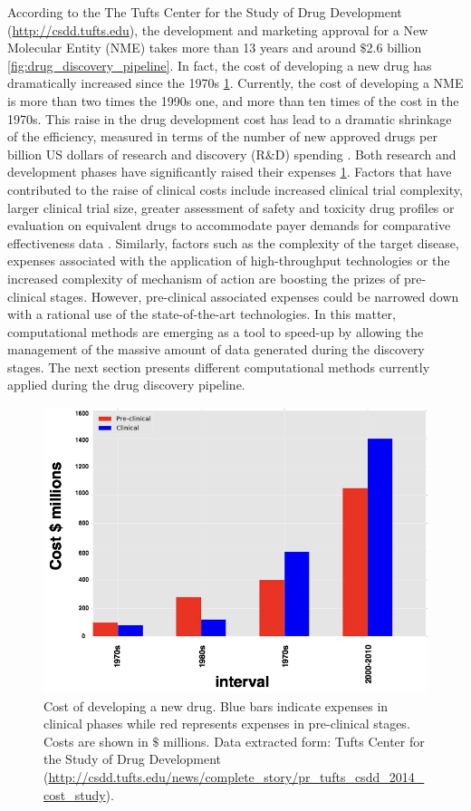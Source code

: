 \documentclass[12pt, a4paper,twoside]{tesi_upf}
\begin{document}
{\par  According to the The Tufts Center for the Study of Drug Development (\url{http://csdd.tufts.edu}), the development and marketing approval for a New Molecular Entity (NME) takes more than 13 years and around  $\$$2.6 billion \ref{fig:drug_discovery_pipeline}. In fact, the cost of developing a new drug has dramatically increased since the 1970s \ref{fig:drug_discovery_evolution}. Currently,  the cost of developing a NME is more than two times the 1990s one, and more than ten times of the cost in the 1970s.   
This raise in the drug development cost has lead to a dramatic shrinkage of the efficiency, measured in terms of the number of new approved drugs per billion US dollars of research and discovery (R$\&$D) spending \cite{Scannell2012}. Both research and development phases have significantly raised their expenses \ref{fig:drug_discovery_evolution}. Factors that have contributed to the raise of clinical costs include increased clinical trial complexity, larger clinical trial size, greater assessment of safety and toxicity drug profiles or evaluation on equivalent drugs to accommodate payer demands for comparative effectiveness data \cite{Scannell2012}. Similarly, factors such as the complexity of the target disease, expenses associated with the application of high-throughput technologies or the increased complexity of mechanism of action are boosting the prizes of pre-clinical stages. However, pre-clinical associated expenses could be narrowed down with a rational use of the state-of-the-art technologies. In this matter, computational methods are emerging as a tool to speed-up by allowing the management of the massive amount of data generated during the discovery stages. The next section presents different computational methods currently applied during the drug discovery pipeline.  
\begin{figure}[!tbp]
\centering
\includegraphics[width=0.9\linewidth]{../figures/drug_discovery_evolution.jpg}
	\caption{Cost of developing a new drug. Blue bars indicate expenses in clinical phases while red represents expenses in pre-clinical stages. Costs are shown in $\$$ millions. Data extracted form: Tufts Center for the Study of Drug Development (\url{http://csdd.tufts.edu/news/complete_story/pr_tufts_csdd_2014_cost_study}).}
\label{fig:drug_discovery_evolution}
	

\end{figure}}
\end{document}
